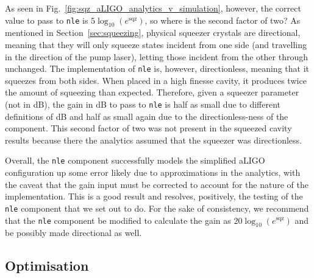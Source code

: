 \documentclass[aps,pra,superscriptaddress,reprint,nofootinbib]{revtex4-1}
\newcommand{\code}[1]{\texttt{#1}}
\begin{document}
As seen in Fig.~\ref{fig:sqz_aLIGO_analytics_v_simulation}, however, the correct value to pass to \code{nle} is $5 \log_{10}(e^\mathrm{sqz})$, so where is the second factor of two? As mentioned in Section~\ref{sec:squeezing}, physical squeezer crystals are directional, meaning that they will only squeeze states incident from one side (and travelling in the direction of the pump laser), letting those incident from the other through unchanged. The implementation of \code{nle} is, however, directionless, meaning that it squeezes from both sides. When placed in a high finesse cavity, it produces twice the amount of squeezing than expected. Therefore, given a squeezer parameter (not in dB), the gain in dB to pass to \code{nle} is half as small due to different definitions of dB and half as small again due to the directionless-ness of the component. This second factor of two was not present in the squeezed cavity results because there the analytics assumed that the squeezer was directionless.


Overall, the \code{nle} component successfully models the simplified aLIGO configuration up some error likely due to approximations in the analytics, with the caveat that the gain input must be corrected to account for the nature of the implementation. This is a good result and resolves, positively, the testing of the \code{nle} component that we set out to do. For the sake of consistency, we recommend that the \code{nle} component be modified to calculate the gain as $20 \log_{10}(e^\mathrm{sqz})$ and be possibly made directional as well.


\subsection{Optimisation}
\label{sec:optimisation}
\end{document}
